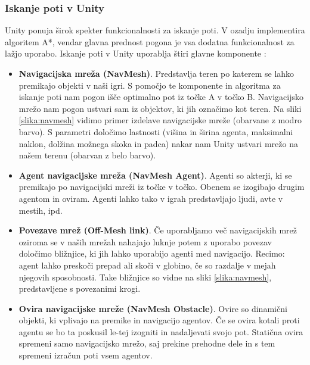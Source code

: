 \documentclass[12pt,a4paper,twoside]{book}
\begin{document}
\subsubsection{Iskanje poti v Unity}

Unity ponuja širok spekter funkcionalnosti za iskanje poti. V ozadju implementira algoritem A*, vendar glavna prednost pogona je vsa dodatna funkcionalnost za lažjo uporabo. Iskanje poti v Unity uporablja štiri glavne komponente \cite{navmesh}:
\begin{itemize}
	\item \textbf{Navigacijska mreža (NavMesh)}. Predstavlja teren po katerem se lahko premikajo objekti v naši igri. S pomočjo te komponente in algoritma za iskanje poti nam pogon išče optimalno pot iz točke A v točko B. Navigacijsko mrežo nam pogon ustvari sam iz objektov, ki jih označimo kot teren. Na sliki \ref{slika:navmesh} vidimo primer izdelave navigacijske mreže (obarvane z modro barvo). S parametri določimo lastnosti (višina in širina agenta, maksimalni naklon, dolžina možnega skoka in padca) nakar nam Unity ustvari mrežo na našem terenu (obarvan z belo barvo).
	\item \textbf{Agent navigacijske mreža (NavMesh Agent)}. Agenti so akterji, ki se premikajo po navigacijski mreži iz točke v točko. Obenem se izogibajo drugim agentom in oviram. Agenti lahko tako v igrah predstavljajo ljudi, avte v mestih, ipd.
	\item \textbf{Povezave mrež (Off-Mesh link)}. Če uporabljamo več navigacijskih mrež oziroma se v naših mrežah nahajajo luknje potem z uporabo povezav določimo bližnjice, ki jih lahko uporabijo agenti med navigacijo. Recimo: agent lahko preskoči prepad ali skoči v globino, če so razdalje v mejah njegovih sposobnosti. Take bližnjice so vidne na sliki \ref{slika:navmesh}, predstavljene s povezanimi krogi.
	\item \textbf{Ovira navigacijske mreže (NavMesh Obstacle)}. Ovire so dinamični objekti, ki vplivajo na premike in navigacijo agentov. Če se ovira kotali proti agentu se bo ta poskusil le-tej izogniti in nadaljevati svojo pot. Statična ovira spremeni samo navigacijsko mrežo, saj prekine prehodne dele in s tem spremeni izračun poti vsem agentov. 
\end{itemize}
\end{document}

